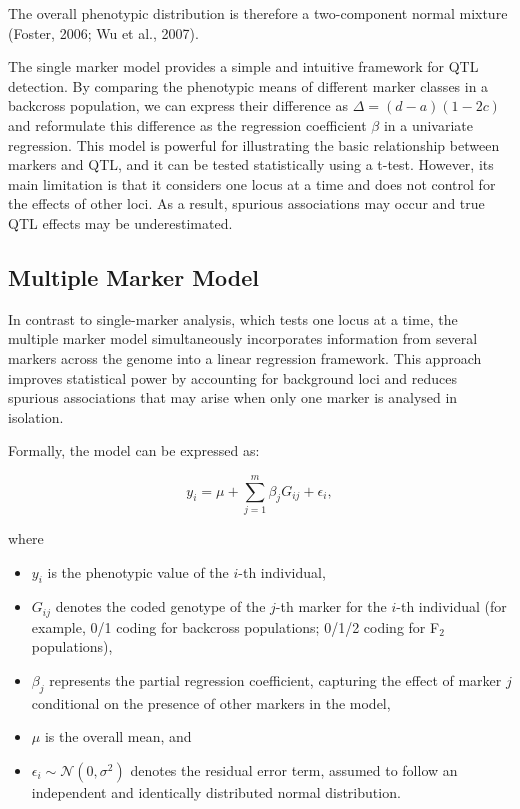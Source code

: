 \documentclass[
  letterpaper,
  DIV=11,
  numbers=noendperiod]{scrartcl}
\providecommand{\tightlist}{%
  \setlength{\itemsep}{0pt}\setlength{\parskip}{0pt}}
\begin{document}
The overall phenotypic distribution is therefore a two-component normal
mixture (Foster, 2006; Wu et al., 2007).

The single marker model provides a simple and intuitive framework for
QTL detection. By comparing the phenotypic means of different marker
classes in a backcross population, we can express their difference as
\(\Delta = (d-a)(1-2c)\) and reformulate this difference as the
regression coefficient \(\beta\) in a univariate regression. This model
is powerful for illustrating the basic relationship between markers and
QTL, and it can be tested statistically using a t-test. However, its
main limitation is that it considers one locus at a time and does not
control for the effects of other loci. As a result, spurious
associations may occur and true QTL effects may be underestimated.

\subsection{Multiple Marker Model}\label{multiple-marker-model}

In contrast to single-marker analysis, which tests one locus at a time,
the multiple marker model simultaneously incorporates information from
several markers across the genome into a linear regression framework.
This approach improves statistical power by accounting for background
loci and reduces spurious associations that may arise when only one
marker is analysed in isolation.

Formally, the model can be expressed as:

\[
y_i = \mu + \sum_{j=1}^{m} \beta_j G_{ij} + \epsilon_i,
\]

where

\begin{itemize}
\tightlist
\item
  \(y_i\) is the phenotypic value of the \(i\)-th individual,\\
\item
  \(G_{ij}\) denotes the coded genotype of the \(j\)-th marker for the
  \(i\)-th individual (for example, 0/1 coding for backcross
  populations; 0/1/2 coding for F\(_2\) populations),\\
\item
  \(\beta_j\) represents the partial regression coefficient, capturing
  the effect of marker \(j\) conditional on the presence of other
  markers in the model,\\
\item
  \(\mu\) is the overall mean, and\\
\item
  \(\epsilon_i \sim \mathcal{N}(0, \sigma^2)\) denotes the residual
  error term, assumed to follow an independent and identically
  distributed normal distribution.
\end{itemize}
\end{document}
